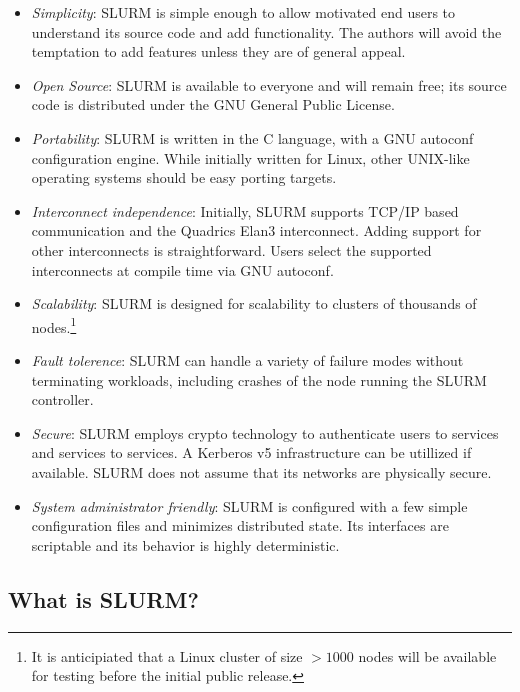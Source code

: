 \begin{itemize}
\item {\em Simplicity}: SLURM is simple enough to allow motivated end users
to understand its source code and add functionality.  The authors will 
avoid the temptation to add features unless they are of general appeal.

\item {\em Open Source}: SLURM is available to everyone and will remain free;
its source code is distributed under the GNU General Public License.

\item {\em Portability}: SLURM is written in the C language, with a GNU 
autoconf configuration engine.  While initially written for Linux, 
other UNIX-like operating systems should be easy porting targets.

\item {\em Interconnect independence}: Initially, SLURM supports TCP/IP based
communication and the Quadrics Elan3 interconnect.  Adding support for other
interconnects is straightforward.  Users select the supported interconnects
at compile time via GNU autoconf.

\item {\em Scalability}: SLURM is designed for scalability to clusters of
thousands of nodes.\footnote{It is anticipiated that a Linux cluster of
size $>1000$ nodes will be available for testing before the initial public 
release.}

\item {\em Fault tolerence}: SLURM can handle a variety of failure modes
without terminating workloads, including crashes of the node running the SLURM
controller.

\item {\em Secure}: SLURM employs crypto technology to authenticate 
users to services and services to services.  
A Kerberos v5 infrastructure can be utillized if available.
SLURM does not assume that its networks are physically secure.

\item {\em System administrator friendly}: SLURM is configured with a few
simple configuration files and minimizes distributed state.  Its interfaces
are scriptable and its behavior is highly deterministic.

\end{itemize}

\subsection{What is SLURM?}


